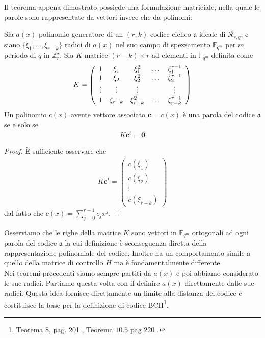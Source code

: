 \noindent
Il teorema appena dimostrato possiede una formulazione matriciale, nella quale le parole sono rappresentate da vettori invece che da polinomi:
\begin{teorema}
   Sia $a(x)$ polinomio generatore di un $(r,k)$-codice ciclico $\mathfrak{a}$ ideale di $\mathcal{R}_{r,q}$, e siano $\lbrace \xi_{1}, \dots,\xi_{r-k} \rbrace $ radici di $a(x)$ nel suo campo di spezzamento $\mathbb{F}_{q^m}$ per $m$ periodo di $q$ in $\mathbb{Z}_{r}^{\star}$.
   Sia $K$ matrice $(r-k)\times r$ ad elementi in $\mathbb{F}_{q^m}$ definita come
   \begin{align*}
        K =
 	\left(
 	\begin{array} {c c c c c}
 	1 & \xi_1 & \xi_{1}^{2} & \dots & \xi_{1}^{r-1}   \\
        1 & \xi_2 & \xi_{2}^{2} & \dots & \xi_{2}^{r-1}   \\
        \vdots & \vdots & \vdots &  & \vdots   \\
        1 & \xi_{r-k}& \xi_{r-k}^{2} & \dots & \xi_{r-k}^{r-1}         
 	\end{array}
 	\right)
     \end{align*}
   Un polinomio $c(x)$ avente vettore associato $\mathbf{c} = c(x) $ è una parola del codice $\mathfrak{a}$ se e solo se 
   \begin{align*}
      K \mathbf{c}^{t} = \mathbf{0}
   \end{align*}
\end{teorema}
\begin{proof}
   È sufficiente osservare che 
   \begin{align*}
        K \mathbf{c}^{t} =
 	\left(
 	\begin{array} {c }
 	c(\xi_1)  \\
        c(\xi_2)   \\
        \vdots  \\
        c(\xi_{r-k})          
 	\end{array}
 	\right)
   \end{align*}
   dal fatto che $c(x) = \sum_{j=0}^{r-1} c_{j}x^{j}$.
\end{proof}
\noindent
Osserviamo che le righe della matrice $K$ sono vettori in $\mathbb{F}_{q^m}$ ortogonali ad ogni parola del codice $\mathfrak{a}$ la cui definizione è sconseguenza diretta della rappresentazione polinomiale del codice. Inoltre ha un comportamento simile a quello della matrice di controllo $H$ ma è fondamentalmente differente.\\ 
Nei teoremi precedenti siamo sempre partiti da $a(x)$ e poi abbiamo considerato le sue radici. Partiamo questa volta con il definire $a(x)$ direttamente dalle sue radici. Questa idea fornisce direttamente un limite alla distanza del codice e costituisce la base per la definizione di codice BCH\footnote{Teorema $8$, pag. 201 \cite{sloane}, Teorema $10.5$ pag $220$ \cite{berardi}.}.

